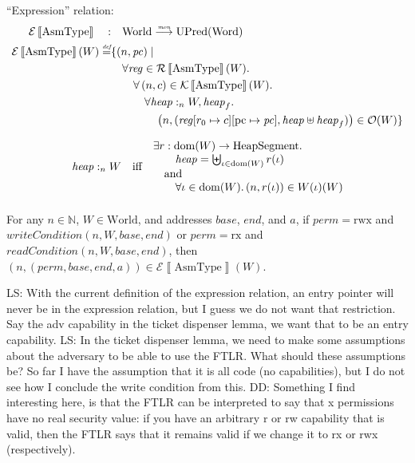 \documentclass{article}
\newcommand{\forcenewline}{$\phantom{v}$\\}
\newcommand{\update}[2]{[#1 \mapsto #2]}
\newcommand{\sem}[1]{\left\llbracket #1 \right\rrbracket}
\newcommand{\monfun}{\stackrel{\textit{\tiny{mon}}}{\longrightarrow}}
\newcommand{\defeq}{\stackrel{\textit{\tiny{def}}}{=}}
\DeclareMathOperator{\dom}{dom}
\newcommand\lau[1]{{\color{purple} \sf \footnotesize {LS: #1}}}
\newcommand\dominique[1]{{\color{purple} \sf \footnotesize {DD: #1}}}
\newcommand{\var}[1]{\mathit{#1}}
\newcommand{\pc}{\mathit{pc}}
\newcommand{\pcreg}{\mathrm{pc}}
\newcommand{\reg}{\var{reg}}
\newcommand{\heap}{\var{heap}}
\newcommand{\perm}{\var{perm}}
\newcommand{\plainfun}[1]{\mathit{#1}}
\newcommand{\readCond}[1]{\plainfun{readCondition}(#1)}
\newcommand{\writeCond}[1]{\plainfun{writeCondition}(#1)}
\newcommand{\heapSat}[3][\heap]{#1 :_{#2} #3}
\newcommand{\asmType}{\plaindom{AsmType}}
\newcommand{\plaindom}[1]{\mathrm{#1}}
\newcommand{\Words}{\plaindom{Word}}
\newcommand{\HeapSegments}{\plaindom{HeapSegment}}
\newcommand{\nats}{\mathbb{N}}
\newcommand{\Worlds}{\plaindom{World}}
\newcommand{\UPred}[1]{\plaindom{UPred}(#1)}
\newcommand{\intr}[2]{\mathcal{#1}\sem{#2}}
\newcommand{\exprintr}[1]{\intr{E}{#1}}
\newcommand{\contintr}[1]{\intr{K}{#1}}
\newcommand{\regintr}[1]{\intr{R}{#1}}
\newcommand{\stder}{\exprintr{\asmType}}
\newcommand{\stdrr}{\regintr{\asmType}}
\newcommand{\stdkr}{\contintr{\asmType}}
\newcommand{\observations}{\mathcal{O}}
\newcommand{\npair}[2][n]{\left(#1,#2 \right)}
\newcommand{\plainperm}[1]{\mathrm{#1}}
\newcommand{\exec}{\plainperm{rx}}
\newcommand{\rwx}{\plainperm{rwx}}
\begin{document}
``Expression'' relation:
\begin{align*}
  \stder \quad : & \quad \Worlds \monfun \UPred{\Words} \\%
  \stder(W) \defeq & \{ \npair{\pc} \mid \\
                   & \quad \forall \reg \in \stdrr(W) \ldotp \\
                   & \qquad \forall \npair{c} \in \stdkr(W) \ldotp \\
                   & \qquad \quad  \forall \heapSat{n}{W}, \heap_f \ldotp \\
                   & \qquad \qquad \npair{(\reg\update{r_0}{c}\update{\pcreg}{\pc},\heap \uplus \heap_f)} \in \observations(W) \}
\end{align*}

\begin{definition}
\begin{align*}
  \heapSat{n}{W} & & \text{iff} & &
                                      \arraycolsep=0pt
                                      \begin{array}{l}
                                      \exists r: \dom(W) \rightarrow \HeapSegments \ldotp \\
                                      \qquad\heap = \biguplus_{\iota\in \dom(W)} r(\iota)\\
                                      \quad\text{and}\\
                                      \qquad\forall \iota \in \dom(W) \ldotp \npair{r(\iota)} \in W(\iota)(W)
                                      \end{array}\\
\end{align*}


\end{definition}
\begin{lemma} \forcenewline
  For any $n \in \nats$, $W \in \Worlds$, and addresses $\var{base}$, $\var{end}$, and $a$, if $\perm = \rwx$ and $\writeCond{n,W,\var{base},\var{end}}$ or $\perm = \exec$ and $\readCond{n,W,\var{base},\var{end}}$, then $\npair{(\perm, \var{base}, \var{end}, a)} \in \stder(W)$.
\end{lemma} %
\lau{With the current definition of the expression relation, an entry pointer will never be in the expression relation, but I guess we do not want that restriction. Say the adv capability in the ticket dispenser lemma, we want that to be an entry capability.}
\lau{In the ticket dispenser lemma, we need to make some assumptions about the adversary to be able to use the FTLR. What should these assumptions be? So far I have the assumption that it is all code (no capabilities), but I do not see how I conclude the write condition from this.}
\dominique{Something I find interesting here, is that the FTLR can be interpreted to say that x permissions have no real security value: if you have an arbitrary r or rw capability that is valid, then the FTLR says that it remains valid if we change it to rx or rwx (respectively).}
\end{document}
